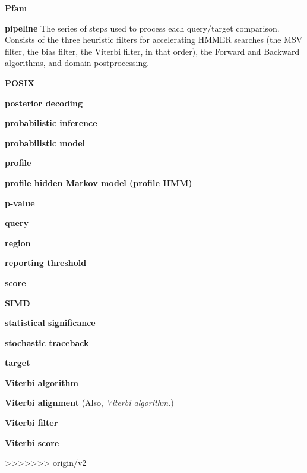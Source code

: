 \begin{wideitem}
\item[\textbf{Pfam}]

\item[\textbf{pipeline}] The series of steps used to process each
query/target comparison. Consists of the three heuristic filters for
accelerating HMMER searches (the MSV filter, the bias filter, the
Viterbi filter, in that order), the Forward and Backward algorithms,
and domain postprocessing.

\item[\textbf{POSIX}]

\item[\textbf{posterior decoding}]

\item[\textbf{probabilistic inference}]

\item[\textbf{probabilistic model}]

\item[\textbf{profile}]

\item[\textbf{profile hidden Markov model (profile HMM)}]

\item[\textbf{p-value}]

\item[\textbf{query}] 

\item[\textbf{region}]

\item[\textbf{reporting threshold}]

\item[\textbf{score}]

\item[\textbf{SIMD}]

\item[\textbf{statistical significance}]

\item[\textbf{stochastic traceback}]

\item[\textbf{target}]

\item[\textbf{Viterbi algorithm}]

\item[\textbf{Viterbi alignment}] (Also, \emph{Viterbi algorithm}.)

\item[\textbf{Viterbi filter}]

\item[\textbf{Viterbi score}]




\end{wideitem}

>>>>>>> origin/v2
